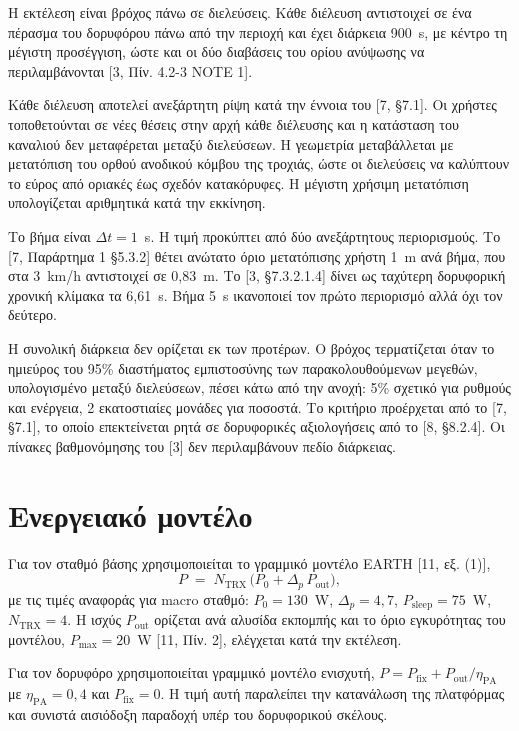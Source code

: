 \documentclass[11pt,a4paper]{article}
\begin{document}
Η εκτέλεση είναι βρόχος πάνω σε διελεύσεις. Κάθε διέλευση αντιστοιχεί σε ένα
πέρασμα του δορυφόρου πάνω από την περιοχή και έχει διάρκεια 900~s, με κέντρο
τη μέγιστη προσέγγιση, ώστε και οι δύο διαβάσεις του ορίου ανύψωσης να
περιλαμβάνονται [3, Πίν. 4.2-3 NOTE 1].

Κάθε διέλευση αποτελεί ανεξάρτητη ρίψη κατά την έννοια του [7, §7.1]. Οι χρήστες
τοποθετούνται σε νέες θέσεις στην αρχή κάθε διέλευσης και η κατάσταση του
καναλιού δεν μεταφέρεται μεταξύ διελεύσεων. Η γεωμετρία μεταβάλλεται με
μετατόπιση του ορθού ανοδικού κόμβου της τροχιάς, ώστε οι διελεύσεις να
καλύπτουν το εύρος από οριακές έως σχεδόν κατακόρυφες. Η μέγιστη χρήσιμη
μετατόπιση υπολογίζεται αριθμητικά κατά την εκκίνηση.

Το βήμα είναι $\Delta t = 1$~s. Η τιμή προκύπτει από δύο ανεξάρτητους
περιορισμούς. Το [7, Παράρτημα 1 §5.3.2] θέτει ανώτατο όριο μετατόπισης
χρήστη 1~m ανά βήμα, που στα 3~km/h αντιστοιχεί σε 0,83~m. Το [3, §7.3.2.1.4]
δίνει ως ταχύτερη δορυφορική χρονική κλίμακα τα 6,61~s. Βήμα 5~s ικανοποιεί τον
πρώτο περιορισμό αλλά όχι τον δεύτερο.

Η συνολική διάρκεια δεν ορίζεται εκ των προτέρων. Ο βρόχος τερματίζεται όταν το
ημιεύρος του 95\% διαστήματος εμπιστοσύνης των παρακολουθούμενων μεγεθών,
υπολογισμένο μεταξύ διελεύσεων, πέσει κάτω από την ανοχή: 5\% σχετικό για
ρυθμούς και ενέργεια, 2 εκατοστιαίες μονάδες για ποσοστά. Το κριτήριο
προέρχεται από το [7, §7.1], το οποίο επεκτείνεται ρητά σε δορυφορικές
αξιολογήσεις από το [8, §8.2.4]. Οι πίνακες βαθμονόμησης του [3] δεν
περιλαμβάνουν πεδίο διάρκειας.

\section{Ενεργειακό μοντέλο}

Για τον σταθμό βάσης χρησιμοποιείται το γραμμικό μοντέλο EARTH [11, εξ. (1)],
\begin{equation}
P \;=\; N_{\mathrm{TRX}}\,\bigl(P_0 + \Delta_p\, P_{\mathrm{out}}\bigr),
\end{equation}
με τις τιμές αναφοράς για macro σταθμό: $P_0 = 130$~W, $\Delta_p = 4{,}7$,
$P_{\mathrm{sleep}} = 75$~W, $N_{\mathrm{TRX}} = 4$. Η ισχύς
$P_{\mathrm{out}}$ ορίζεται ανά αλυσίδα εκπομπής και το όριο εγκυρότητας του
μοντέλου, $P_{\max} = 20$~W [11, Πίν. 2], ελέγχεται κατά την εκτέλεση.

Για τον δορυφόρο χρησιμοποιείται γραμμικό μοντέλο ενισχυτή,
$P = P_{\mathrm{fix}} + P_{\mathrm{out}}/\eta_{\mathrm{PA}}$ με
$\eta_{\mathrm{PA}} = 0{,}4$ και $P_{\mathrm{fix}} = 0$. Η τιμή αυτή παραλείπει
την κατανάλωση της πλατφόρμας και συνιστά αισιόδοξη παραδοχή υπέρ του
δορυφορικού σκέλους.
\end{document}

